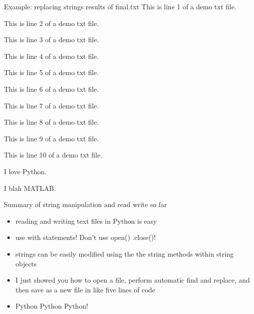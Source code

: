 \documentclass[10pt]{beamer}
\begin{document}

\begin{frame}{Example: replacing strings results of final.txt}
This is line 1 of a demo txt file.

This is line 2 of a demo txt file.

This is line 3 of a demo txt file.

This is line 4 of a demo txt file.

This is line 5 of a demo txt file.

This is line 6 of a demo txt file.

This is line 7 of a demo txt file.

This is line 8 of a demo txt file.

This is line 9 of a demo txt file.

This is line 10 of a demo txt file.

I love Python.

I blah MATLAB.
\end{frame}

\begin{frame}{Summary of string manipulation and read write so far}
\begin{itemize}
\item reading and writing text files in Python is easy
\item use with statements! Don't use open() .close()!
\item strings can be easily modified using the the string methods within string objects
\item I just showed you how to open a file, perform automatic find and replace, and then save as a new file in like five lines of code
\item Python Python Python!
\end{itemize}
\end{frame}
\end{document}
